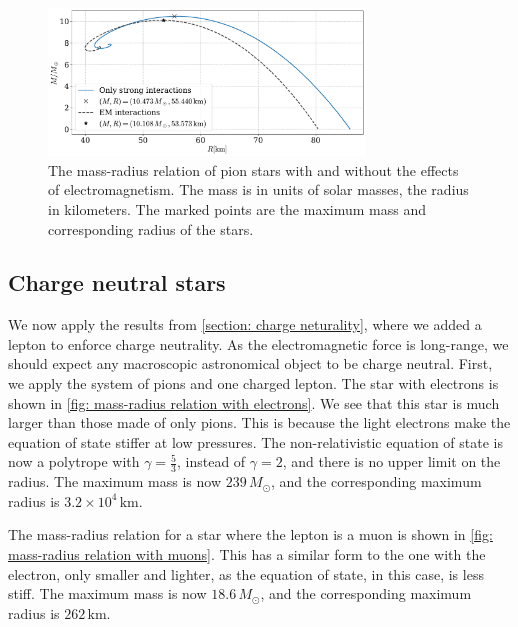 \begin{figure}[H]
    \centering
    \includegraphics[width=0.75\textwidth]{../scripts/figurer/pion_star/mass_radius_pion_star_compare.pdf}
    \caption{
        The mass-radius relation of pion stars with and without the effects of electromagnetism.
        The mass is in units of solar masses, the radius in kilometers.
        The marked points are the maximum mass and corresponding radius of the stars.
        }
        \label{fig: mass-radius relation comparison}
\end{figure} 




\subsection{Charge neutral stars}


We now apply the results from \autoref{section: charge neturality}, where we added a lepton to enforce charge neutrality.
As the electromagnetic force is long-range, we should expect any macroscopic astronomical object to be charge neutral.
First, we apply the system of pions and one charged lepton.
The star with electrons is shown in \autoref{fig: mass-radius relation with electrons}.
We see that this star is much larger than those made of only pions.
This is because the light electrons make the equation of state stiffer at low pressures.
The non-relativistic equation of state is now a polytrope with $\gamma = \frac{5}{3}$, instead of $\gamma = 2$, and there is no upper limit on the radius.
The maximum mass is now $239\, M_\odot $, and the corresponding maximum radius is $ 3.2\times10^4\,\text{km}$.

The mass-radius relation for a star where the lepton is a muon is shown in \autoref{fig: mass-radius relation with muons}.
This has a similar form to the one with the electron, only smaller and lighter, as the equation of state, in this case, is less stiff.
The maximum mass is now $18.6\, M_\odot $, and the corresponding maximum radius is $ 262 \,\text{km}$.

